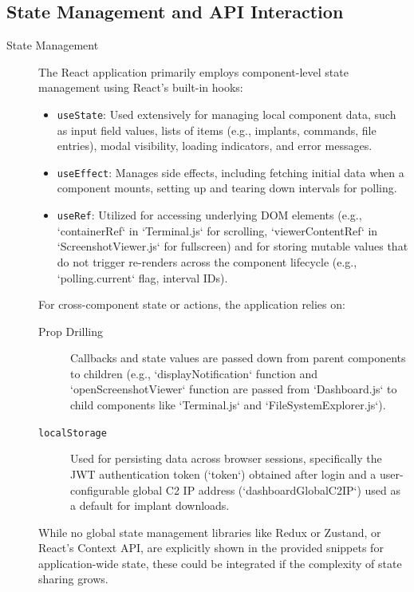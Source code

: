 \subsection{State Management and API Interaction}
\begin{description}
    \item[State Management]
    The React application primarily employs component-level state management using React's built-in hooks:
    \begin{itemize}
        \item \texttt{useState}: Used extensively for managing local component data, such as input field values, lists of items (e.g., implants, commands, file entries), modal visibility, loading indicators, and error messages.
        \item \texttt{useEffect}: Manages side effects, including fetching initial data when a component mounts, setting up and tearing down intervals for polling.
        \item \texttt{useRef}: Utilized for accessing underlying DOM elements (e.g., `containerRef` in `Terminal.js` for scrolling, `viewerContentRef` in `ScreenshotViewer.js` for fullscreen) and for storing mutable values that do not trigger re-renders across the component lifecycle (e.g., `polling.current` flag, interval IDs).
    \end{itemize}
    For cross-component state or actions, the application relies on:
    \begin{description}
        \item[Prop Drilling] Callbacks and state values are passed down from parent components to children (e.g., `displayNotification` function and `openScreenshotViewer` function are passed from `Dashboard.js` to child components like `Terminal.js` and `FileSystemExplorer.js`).
        \item[\texttt{localStorage}] Used for persisting data across browser sessions, specifically the JWT authentication token (`token`) obtained after login and a user-configurable global C2 IP address (`dashboardGlobalC2IP`) used as a default for implant downloads.
    \end{description}
    While no global state management libraries like Redux or Zustand, or React's Context API, are explicitly shown in the provided snippets for application-wide state, these could be integrated if the complexity of state sharing grows.


\end{description}
